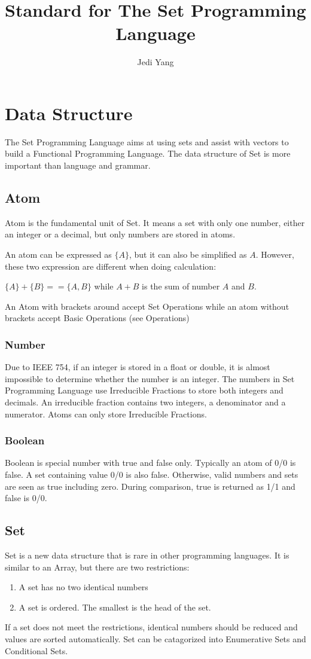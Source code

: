 \documentclass[12pt, a4paper]{IEEEtran}
\title{Standard for The Set Programming Language}
\author{Jedi Yang}
\begin{document}
\maketitle

\section{Data Structure}
	The Set Programming Language aims at using sets and assist with vectors to build a Functional Programming Language. The data structure of Set is more important than language and grammar.

\subsection{Atom}
	Atom is the fundamental unit of Set. It means a set with only one number, either an integer or a decimal, but only numbers are stored in atoms.
	
	An atom can be expressed as $\{A\}$, but it can also be simplified as $A$. However, these two expression are different when doing calculation:
	
	$\{A\} + \{B\} == \{A, B\}$ while $A + B$ is the sum of number $A$ and $B$.
	
	An Atom with brackets around accept Set Operations while an atom without brackets accept Basic Operations (see Operations)
	
	\subsubsection{Number}
	Due to IEEE 754, if an integer is stored in a float or double, it is almost impossible to determine whether the number is an integer. The numbers in Set Programming Language use Irreducible Fractions to store both integers and decimals. An irreducible fraction contains two integers, a denominator and a numerator. Atoms can only store Irreducible Fractions.
	\subsubsection{Boolean}
	Boolean is special number with true and false only. Typically an atom of 0/0 is false. A set containing value 0/0 is also false. Otherwise, valid numbers and sets are seen as true including zero. During comparison, true is returned as {1/1} and false is {0/0}.

\subsection{Set}
	Set is a new data structure that is rare in other programming languages. It is similar to an Array, but there are two restrictions:
	\begin{enumerate}
	\item A set has no two identical numbers
	\item A set is ordered. The smallest is the head of the set.
	\end{enumerate}
	If a set does not meet the restrictions, identical numbers should be reduced and values are sorted automatically. Set can be catagorized into Enumerative Sets and Conditional Sets.
	
\end{document}
